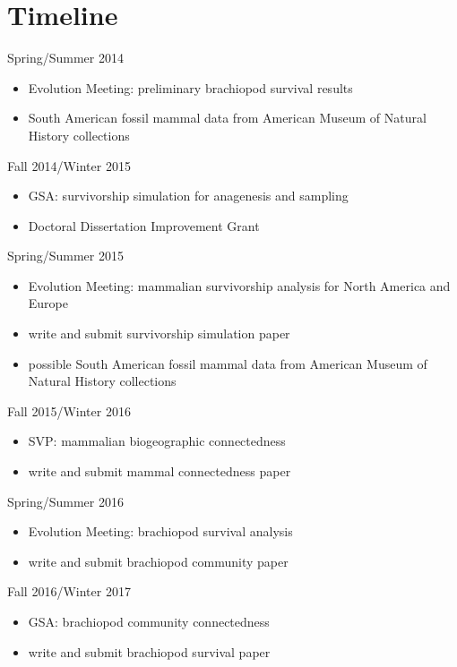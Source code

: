 \documentclass[12pt,letterpaper]{article}
\begin{document}
\clearpage

\section{Timeline}

Spring/Summer 2014
\begin{itemize}
  \item Evolution Meeting: preliminary brachiopod survival results
  \item South American fossil mammal data from American Museum of Natural History collections
\end{itemize}

Fall 2014/Winter 2015
\begin{itemize}
  \item GSA: survivorship simulation for anagenesis and sampling
  \item Doctoral Dissertation Improvement Grant
\end{itemize}

Spring/Summer 2015
\begin{itemize}
  \item Evolution Meeting: mammalian survivorship analysis for North America and Europe
  \item write and submit survivorship simulation paper
  \item possible South American fossil mammal data from American Museum of Natural History collections
\end{itemize}

Fall 2015/Winter 2016
\begin{itemize}
  \item SVP: mammalian biogeographic connectedness
  \item write and submit mammal connectedness paper
\end{itemize}

Spring/Summer 2016
\begin{itemize}
  \item Evolution Meeting: brachiopod survival analysis
  \item write and submit brachiopod community paper
\end{itemize}

Fall 2016/Winter 2017
\begin{itemize}
  \item GSA: brachiopod community connectedness
  \item write and submit brachiopod survival paper
\end{itemize}
\end{document}
